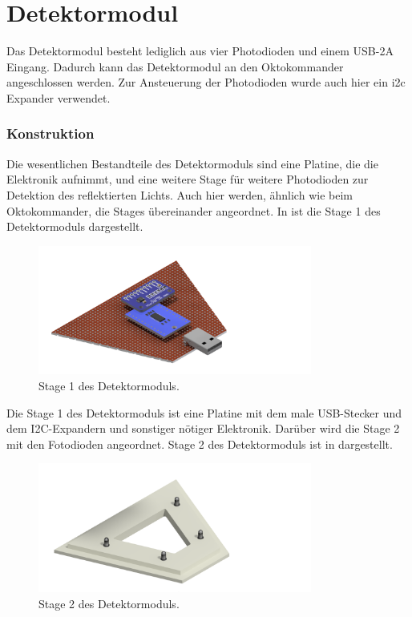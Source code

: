 
\section{Detektormodul}
\label{sec:Detektormodul}

Das Detektormodul besteht lediglich aus vier Photodioden und einem USB-2A Eingang. Dadurch kann das Detektormodul an den Oktokommander angeschlossen werden. Zur Ansteuerung der Photodioden wurde auch hier ein i2c Expander verwendet. 


\subsubsection*{Konstruktion}
Die wesentlichen Bestandteile des Detektormoduls sind eine Platine, die die Elektronik aufnimmt, und eine weitere Stage für weitere Photodioden zur Detektion des reflektierten Lichts. Auch hier werden, ähnlich wie beim Oktokommander, die Stages übereinander angeordnet. In  ist die Stage 1 des Detektormoduls dargestellt.

\begin{figure}[h]
	\centering
	\includegraphics[width=9cm]{../CAD_Bilder/DetektorElektronik_Stage1_raytraced.png}
	\caption{Stage 1 des Detektormoduls.}
	\label{fig:DetektorStage1}
\end{figure}

Die Stage 1 des Detektormoduls ist eine Platine mit dem male USB-Stecker und dem I2C-Expandern und sonstiger nötiger Elektronik. Darüber wird die Stage 2 mit den Fotodioden angeordnet. Stage 2 des Detektormoduls ist in  dargestellt.

\begin{figure}[h]
	\centering
	\includegraphics[width=9cm]{../CAD_Bilder/Detektormodul_Stage2_raytraced.png}
	\caption{Stage 2 des Detektormoduls.}
	\label{fig:DetektorStage2}
\end{figure}

